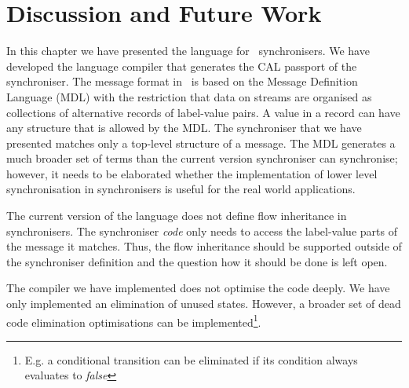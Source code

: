 \section{Discussion and Future Work}
In this chapter we have presented the language for \ak\ synchronisers. We have developed the language compiler that generates the CAL passport of the synchroniser. The message format in \ak\ is based on the Message Definition Language (MDL) with the restriction that data on streams are organised as collections of alternative records of label-value pairs. A value in a record can have any structure that is allowed by the MDL. The synchroniser that we have presented matches only a top-level structure of a message. The MDL generates a much broader set of terms than the current version synchroniser can synchronise; however, it needs to be elaborated whether the implementation of lower level synchronisation in synchronisers is useful for the real world applications.

The current version of the language does not define flow inheritance in synchronisers. The synchroniser \emph{code} only needs to access the label-value parts of the message it matches. Thus, the flow inheritance should be supported outside of the synchroniser definition and the question how it should be done is left open.

The compiler we have implemented does not optimise the code deeply. We have only implemented an elimination of unused states. However, a broader set of dead code elimination optimisations can be implemented\footnote{E.g. a conditional transition can be eliminated if its condition always evaluates to \emph{false}}.
